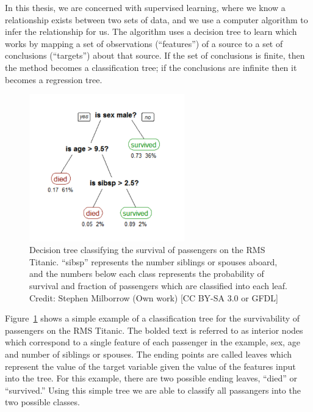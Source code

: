 In this thesis, we are concerned with supervised learning, where we know a relationship exists between two sets of data, and we use a computer algorithm to infer the relationship for us. The algorithm uses a decision tree to learn which works by mapping a set of observations (``features'') of a source to a set of conclusions (``targets'') about that source. If the set of conclusions is finite, then the method becomes a classification tree; if the conclusions are infinite then it becomes a regression tree. 

\begin{figure}[ht]
	\begin{center}
		\includegraphics[width=0.6\textwidth]{figures/CART_tree_titanic_survivors.pdf} 
	\end{center}
	\caption[An example of a classification tree.]{Decision tree classifying the survival of passengers on the RMS Titanic. ``sibsp'' represents the number siblings or spouses aboard, and the numbers below each class represents the probability of survival and fraction of passengers which are classified into each leaf. Credit: Stephen Milborrow (Own work) [CC BY-SA 3.0 or GFDL]}
	\label{fig: cart tree} 
\end{figure}

Figure~\ref{fig: cart tree} shows a simple example of a classification tree for the survivability of passengers on the RMS Titanic. The bolded text is referred to as interior nodes which correspond to a single feature of each passenger in the example, sex, age and number of siblings or spouses. The ending points are called leaves which represent the value of the target variable given the value of the features input into the tree. For this example, there are two possible ending leaves, ``died'' or ``survived.'' Using this simple tree we are able to classify all passangers into the two possible classes. 

